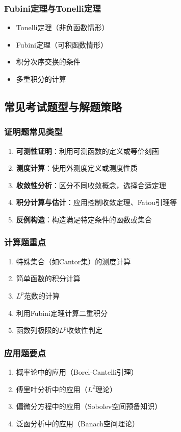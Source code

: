 \subsubsection{Fubini定理与Tonelli定理}
\begin{itemize}
    \item Tonelli定理（非负函数情形）
    \item Fubini定理（可积函数情形）
    \item 积分次序交换的条件
    \item 多重积分的计算
\end{itemize}

\subsection{常见考试题型与解题策略}

\subsubsection{证明题常见类型}
\begin{enumerate}
    \item \textbf{可测性证明}：利用可测函数的定义或等价刻画
    \item \textbf{测度计算}：使用外测度定义或测度性质
    \item \textbf{收敛性分析}：区分不同收敛概念，选择合适定理
    \item \textbf{积分计算与估计}：应用控制收敛定理、Fatou引理等
    \item \textbf{反例构造}：构造满足特定条件的函数或集合
\end{enumerate}

\subsubsection{计算题重点}
\begin{enumerate}
    \item 特殊集合（如Cantor集）的测度计算
    \item 简单函数的积分计算
    \item $L^p$范数的计算
    \item 利用Fubini定理计算二重积分
    \item 函数列极限的$L^p$收敛性判定
\end{enumerate}

\subsubsection{应用题要点}
\begin{enumerate}
    \item 概率论中的应用（Borel-Cantelli引理）
    \item 傅里叶分析中的应用（$L^2$理论）
    \item 偏微分方程中的应用（Sobolev空间预备知识）
    \item 泛函分析中的应用（Banach空间理论）
\end{enumerate}


